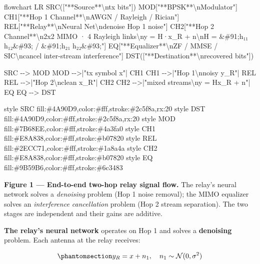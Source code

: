 \documentclass[
  english,
  12pt,
  12pt,
  a4paper,
  oneside]{report}
\newenvironment{Shaded}{}{}
\newcommand{\NormalTok}[1]{#1}
\begin{document}
\begin{Shaded}
\begin{Highlighting}[]
\NormalTok{flowchart LR}
\NormalTok{    SRC(["**Source**\textbackslash{}ntx bits"])}
\NormalTok{    MOD["**BPSK**\textbackslash{}nModulator"]}
\NormalTok{    CH1["**Hop 1 Channel**\textbackslash{}nAWGN / Rayleigh / Rician"]}
\NormalTok{    REL["**Relay**\textbackslash{}nNeural Net\textbackslash{}ndenoise Hop 1 noise"]}
\NormalTok{    CH2["**Hop 2 Channel**\textbackslash{}n2x2 MIMO · 4 Rayleigh links\textbackslash{}ny = H·x\_R + n\textbackslash{}nH = \&\#91;h₁₁ h₁₂\&\#93; / \&\#91;h₂₁ h₂₂\&\#93;"]}
\NormalTok{    EQ["**Equalizer**\textbackslash{}nZF / MMSE / SIC\textbackslash{}ncancel inter{-}stream interference"]}
\NormalTok{    DST(["**Destination**\textbackslash{}nrecovered bits"])}

\NormalTok{    SRC {-}{-}\textgreater{} MOD}
\NormalTok{    MOD {-}{-}\textgreater{}|"tx symbol x"| CH1}
\NormalTok{    CH1 {-}{-}\textgreater{}|"Hop 1\textbackslash{}nnoisy y\_R"| REL}
\NormalTok{    REL {-}{-}\textgreater{}|"Hop 2\textbackslash{}nclean x\_R"| CH2}
\NormalTok{    CH2 {-}{-}\textgreater{}|"mixed streams\textbackslash{}ny = Hx\_R + n"| EQ}
\NormalTok{    EQ {-}{-}\textgreater{} DST}

\NormalTok{    style SRC  fill:\#4A90D9,color:\#fff,stroke:\#2c5f8a,rx:20}
\NormalTok{    style DST  fill:\#4A90D9,color:\#fff,stroke:\#2c5f8a,rx:20}
\NormalTok{    style MOD  fill:\#7B68EE,color:\#fff,stroke:\#4a3fa0}
\NormalTok{    style CH1  fill:\#E8A838,color:\#fff,stroke:\#b07820}
\NormalTok{    style REL  fill:\#2ECC71,color:\#fff,stroke:\#1a8a4a}
\NormalTok{    style CH2  fill:\#E8A838,color:\#fff,stroke:\#b07820}
\NormalTok{    style EQ   fill:\#9B59B6,color:\#fff,stroke:\#6c3483}
\end{Highlighting}
\end{Shaded}

\textbf{Figure 1 --- End-to-end two-hop relay signal flow.} The relay's neural network solves a \emph{denoising} problem (Hop 1 noise removal); the MIMO equalizer solves an \emph{interference cancellation} problem (Hop 2 stream separation). The two stages are independent and their gains are additive.

\textbf{The relay's neural network} operates on Hop 1 and solves a \textbf{denoising} problem. Each antenna at the relay receives:

\begin{equation}\protect\phantomsection\label{eq:relay-received-siso}{y_R = x + n_1, \quad n_1 \sim \mathcal{N}(0, \sigma^2)
}\end{equation}
\end{document}
